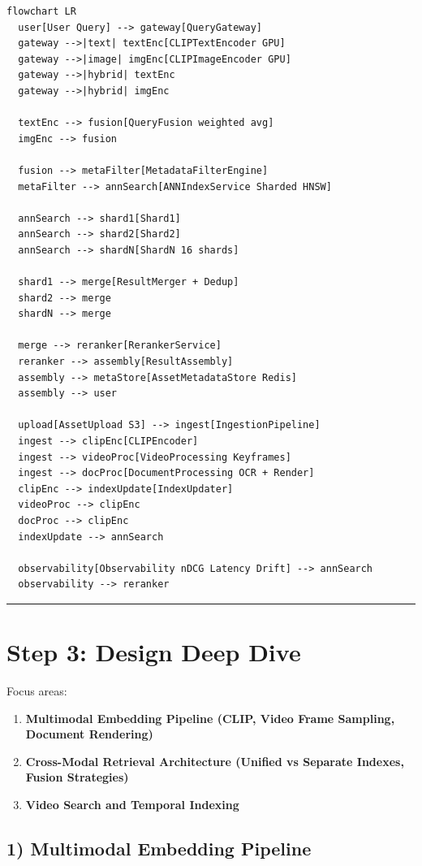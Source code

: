 \begin{verbatim}
flowchart LR
  user[User Query] --> gateway[QueryGateway]
  gateway -->|text| textEnc[CLIPTextEncoder GPU]
  gateway -->|image| imgEnc[CLIPImageEncoder GPU]
  gateway -->|hybrid| textEnc
  gateway -->|hybrid| imgEnc

  textEnc --> fusion[QueryFusion weighted avg]
  imgEnc --> fusion

  fusion --> metaFilter[MetadataFilterEngine]
  metaFilter --> annSearch[ANNIndexService Sharded HNSW]

  annSearch --> shard1[Shard1]
  annSearch --> shard2[Shard2]
  annSearch --> shardN[ShardN 16 shards]

  shard1 --> merge[ResultMerger + Dedup]
  shard2 --> merge
  shardN --> merge

  merge --> reranker[RerankerService]
  reranker --> assembly[ResultAssembly]
  assembly --> metaStore[AssetMetadataStore Redis]
  assembly --> user

  upload[AssetUpload S3] --> ingest[IngestionPipeline]
  ingest --> clipEnc[CLIPEncoder]
  ingest --> videoProc[VideoProcessing Keyframes]
  ingest --> docProc[DocumentProcessing OCR + Render]
  clipEnc --> indexUpdate[IndexUpdater]
  videoProc --> clipEnc
  docProc --> clipEnc
  indexUpdate --> annSearch

  observability[Observability nDCG Latency Drift] --> annSearch
  observability --> reranker
\end{verbatim}

\bigskip\hrule\bigskip

\section*{Step 3: Design Deep Dive}

Focus areas:

\begin{enumerate}
  \item \textbf{Multimodal Embedding Pipeline (CLIP, Video Frame Sampling, Document Rendering)}
  \item \textbf{Cross-Modal Retrieval Architecture (Unified vs Separate Indexes, Fusion Strategies)}
  \item \textbf{Video Search and Temporal Indexing}
\end{enumerate}

\subsection*{1) Multimodal Embedding Pipeline}

